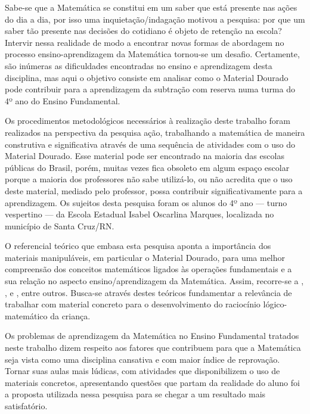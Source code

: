 \begin{refsection}
    Sabe-se que a Matemática se constitui em um saber que está presente nas ações do dia a dia, por isso uma inquietação/indagação motivou a pesquisa: por que um saber tão presente nas decisões do cotidiano é objeto de retenção na escola? Intervir nessa realidade de modo a encontrar novas formas de abordagem no processo ensino-aprendizagem da Matemática tornou-se um desafio. Certamente, são inúmeras as dificuldades encontradas no ensino e aprendizagem desta disciplina, mas aqui o objetivo consiste em analisar como o Material Dourado pode contribuir para a aprendizagem da subtração com reserva numa turma do 4º ano do Ensino Fundamental. 

    Os procedimentos metodológicos necessários à realização deste trabalho foram realizados na perspectiva da pesquisa ação, trabalhando a matemática de maneira construtiva e significativa através de uma sequência de atividades com o uso do Material Dourado. Esse material pode ser encontrado na maioria das escolas públicas do Brasil, porém, muitas vezes fica obsoleto em algum espaço escolar porque a maioria dos professores não sabe utilizá-lo, ou não acredita que o uso deste material, mediado pelo professor, possa contribuir significativamente para a aprendizagem. Os sujeitos desta pesquisa foram os alunos do 4º ano --- turno vespertino --- da Escola Estadual Isabel Oscarlina Marques, localizada no município de Santa Cruz/RN. 

    O referencial teórico que embasa esta pesquisa aponta a importância dos materiais manipuláveis, em particular o Material Dourado, para uma melhor compreensão dos conceitos matemáticos ligados às operações fundamentais e a sua relação no aspecto ensino/aprendizagem da Matemática. Assim, recorre-se a \textcite{NACARATO2005trabalho}, \textcite{BERTONAndITACARAMBI2009Números}, \textcite{CENTURIÓN1995Números} e \textcite{LORENZATO2006Começar}, entre outros. Busca-se através destes teóricos fundamentar a relevância de trabalhar com material concreto para o desenvolvimento do raciocínio lógico-matemático da criança.  

    Os problemas de aprendizagem da Matemática no Ensino Fundamental tratados neste trabalho dizem respeito aos fatores que contribuem para que a Matemática seja vista como uma disciplina cansativa e com maior índice de reprovação. Tornar suas aulas mais lúdicas, com atividades que disponibilizem o uso de materiais concretos, apresentando questões que partam da realidade do aluno foi a proposta utilizada nessa pesquisa para se chegar a um resultado mais satisfatório.  


\end{refsection}
